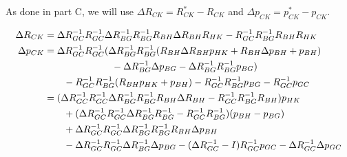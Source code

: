 \documentclass[letterpaper, 11pt]{article}
\begin{document}
As done in part C, we will use $\Delta R_{CK} = R_{CK}^* - R_{CK}$ and $\Delta p_{CK} = p_{CK}^* - p_{CK}$.

\begin{align}
	\Delta R_{CK} &= \Delta R_{GC}^{-1}R_{GC}^{-1}\Delta R_{BG}^{-1}R_{BG}^{-1}R_{BH}\Delta R_{BH}R_{HK} - R_{GC}^{-1}R_{BG}^{-1}R_{BH}R_{HK} \\
    \Delta p_{CK} &= \Delta R_{GC}^{-1}R_{GC}^{-1}(\Delta R_{BG}^{-1}R_{BG}^{-1}(R_{BH}\Delta R_{BH}p_{HK} + R_{BH}\Delta p_{BH} + p_{BH}) \notag \\ 
    & \qquad \qquad \qquad \quad -\Delta R_{BG}^{-1}\Delta p_{BG} - \Delta R_{BG}^{-1}R_{BG}^{-1}p_{BG}) \notag \\
	& \qquad - R_{GC}^{-1}R_{BG}^{-1}(R_{BH}p_{HK} + p_{BH}) - R_{GC}^{-1}R_{BG}^{-1}p_{BG}-R_{GC}^{-1}p_{GC} \\
   	&= (\Delta R_{GC}^{-1}R_{GC}^{-1}\Delta R_{BG}^{-1}R_{BG}^{-1}R_{BH}\Delta R_{BH} - R_{GC}^{-1}R_{BG}^{-1}R_{BH})p_{HK} \notag \\
   	& \qquad + (\Delta R_{GC}^{-1}R_{GC}^{-1}\Delta R_{BG}^{-1}R_{BG}^{-1} - R_{GC}^{-1}R_{BG}^{-1})(p_{BH} - p_{BG}) \notag \\ 
    & \qquad + \Delta R_{GC}^{-1}R_{GC}^{-1}\Delta R_{BG}^{-1}R_{BG}^{-1}R_{BH}\Delta p_{BH} \notag \\
    & \qquad - \Delta R_{GC}^{-1}R_{GC}^{-1}\Delta R_{BG}^{-1}\Delta p_{BG} - (\Delta R_{GC}^{-1} - I)R_{GC}^{-1}p_{GC} - \Delta R_{GC}^{-1}\Delta p_{GC}
\end{align}
\end{document}

